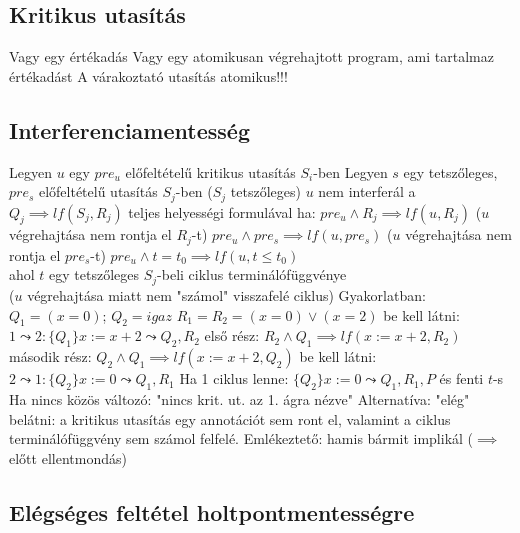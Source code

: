 \documentclass[12pt,a4paper]{article}
\begin{document}
\subsection{Kritikus utasítás}

\begin{outline}
	\1 Vagy egy értékadás
	\1 Vagy egy atomikusan végrehajtott program, ami tartalmaz értékadást
		\2 A várakoztató utasítás atomikus!!!
\end{outline}

\pagebreak

\subsection{Interferenciamentesség}

\begin{outline}
	\1 Legyen $u$ egy $pre_u$ előfeltételű kritikus utasítás $S_i$-ben
	\1 Legyen $s$ egy tetszőleges, $pre_s$ előfeltételű utasítás $S_j$-ben ($S_j$ tetszőleges)
	\1 $u$ nem interferál a $Q_j \implies lf(S_j,R_j)$ teljes helyességi formulával ha:
		\2 $pre_u \wedge R_j \implies lf(u,R_j)$ \;\; ($u$ végrehajtása nem rontja el $R_j$-t)
		\2 $pre_u \wedge pre_s \implies lf(u,pre_s)$ \;\; ($u$ végrehajtása nem rontja el $pre_s$-t)
		\2 $pre_u \wedge t=t_0 \implies lf(u, t \le t_0)$\\
		ahol $t$ egy tetszőleges $S_j$-beli ciklus terminálófüggvénye \\
		($u$ végrehajtása miatt nem "számol" visszafelé ciklus)
	\1 Gyakorlatban:
		\2 $Q_1 = (x=0)$; $Q_2=igaz$
		\2 $R_1=R_2 = (x=0) \lor (x=2)$
		\2 be kell látni: $1 \leadsto 2: \{Q_1\}x := x+2 \leadsto Q_2,R_2$
			\3 első rész: $R_2 \wedge Q_1 \implies lf(x:=x+2, R_2)$
			\3 második rész: $Q_2 \wedge Q_1 \implies lf(x := x+2, Q_2)$
		\2 be kell látni: $2 \leadsto 1: \{Q_2\}x := 0 \leadsto Q_1,R_1$
			\3 Ha 1 ciklus lenne: $\{Q_2\}x := 0 \leadsto Q_1,R_1,P$ és fenti $t$-s
			\3 Ha nincs közös változó: "nincs krit. ut. az 1. ágra nézve"
		\2 Alternatíva: "elég" belátni: a kritikus utasítás egy annotációt sem ront el,
		valamint a ciklus terminálófüggvény sem számol felfelé.
		\2 Emlékeztető: hamis bármit implikál ($\implies$ előtt ellentmondás)
\end{outline}

\pagebreak

\subsection{Elégséges feltétel holtpontmentességre}
\end{document}
